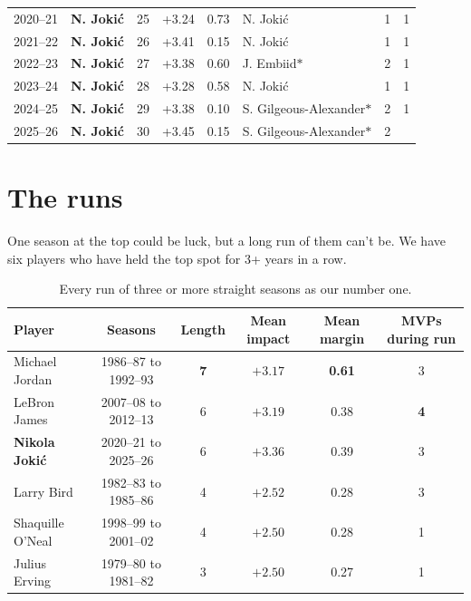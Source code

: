 \documentclass[11pt]{article}
\begin{document}
\begin{table}[p]
\begin{tabular}{llcccl cc}
2020--21 & \textbf{N. Jokić} & 25 & +3.24 & 0.73 & N. Jokić & 1 & 1 \\
2021--22 & \textbf{N. Jokić} & 26 & +3.41 & 0.15 & N. Jokić & 1 & 1 \\
2022--23 & \textbf{N. Jokić} & 27 & +3.38 & 0.60 & J. Embiid$\ast$ & 2 & 1 \\
2023--24 & \textbf{N. Jokić} & 28 & +3.28 & 0.58 & N. Jokić & 1 & 1 \\
2024--25 & \textbf{N. Jokić} & 29 & +3.38 & 0.10 & S. Gilgeous-Alexander$\ast$ & 2 & 1 \\
2025--26 & \textbf{N. Jokić} & 30 & +3.45 & 0.15 & S. Gilgeous-Alexander$\ast$ & 2 &  \\
\bottomrule
\end{tabular}
\label{tab:all}
\end{table}

\section*{The runs}

One season at the top could be luck, but a long run of them can't be. We have six players who
have held the top spot for 3+ years in a row.

\begin{table}[h]
\centering\small
\caption{Every run of three or more straight seasons as our number one.}
\begin{tabular}{lccccc}
\toprule
Player & Seasons & Length & Mean impact & Mean margin & MVPs during run \\
\midrule
Michael Jordan & 1986--87 to 1992--93 & \textbf{7} & $+3.17$ & \textbf{0.61} & 3 \\
LeBron James & 2007--08 to 2012--13 & 6 & $+3.19$ & 0.38 & \textbf{4} \\
\textbf{Nikola Jokić} & 2020--21 to 2025--26 & 6 & $\mathbf{+3.36}$ & 0.39 & 3 \\
Larry Bird & 1982--83 to 1985--86 & 4 & $+2.52$ & 0.28 & 3 \\
Shaquille O'Neal & 1998--99 to 2001--02 & 4 & $+2.50$ & 0.28 & 1 \\
Julius Erving & 1979--80 to 1981--82 & 3 & $+2.50$ & 0.27 & 1 \\
\bottomrule
\end{tabular}
\label{tab:runs}
\end{table}
\end{document}
